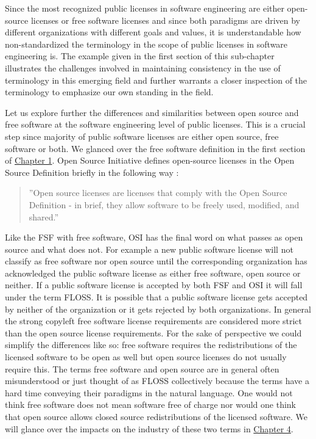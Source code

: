 Since the most recognized public licenses in software engineering are either open-source licenses or free software licenses and since both paradigms are driven by different organizations with different goals and values, it is understandable how non-standardized the terminology in the scope of public licenses in software engineering is. The example given in the first section of this sub-chapter illustrates the challenges involved in maintaining consistency in the use of terminology in this emerging field and further warrants a closer inspection of the terminology to emphasize our own standing in the field.

Let us explore further the differences and similarities between open source and free software at the software engineering level of public licenses. This is a crucial step since majority of public software licenses are either open source, free software or both. We glanced over the free software definition in the first section of \hyperref[intro]{Chapter 1}. Open Source Initiative defines open-source licenses in the Open Source Definition briefly in the following way \citep{osi:licenselist}:
\begin{quote}
	''Open source licenses are licenses that comply with the Open Source Definition - in brief, they allow software to be freely used, modified, and shared.''
\end{quote}
Like the FSF with free software, OSI has the final word on what passes as open source and what does not. For example a new public software license will not classify as free software nor open source until the corresponding organization has acknowledged the public software license as either free software, open source or neither. If a public software license is accepted by both FSF and OSI it will fall under the term FLOSS. It is possible that a public software license gets accepted by neither of the organization or it gets rejected by both organizations. In general the strong copyleft free software license requirements are considered more strict than the open source license requirements. For the sake of perspective we could simplify the differences like so: free software requires the redistributions of the licensed software to be open as well but open source licenses do not usually require this. The terms free software and open source are in general often misunderstood or just thought of as FLOSS collectively because the terms have a hard time conveying their paradigms in the natural language. One would not think free software does not mean software free of charge nor would one think that open source allows closed source redistributions of the licensed software. We will glance over the impacts on the industry of these two terms in \hyperref[discussion]{Chapter 4}.

